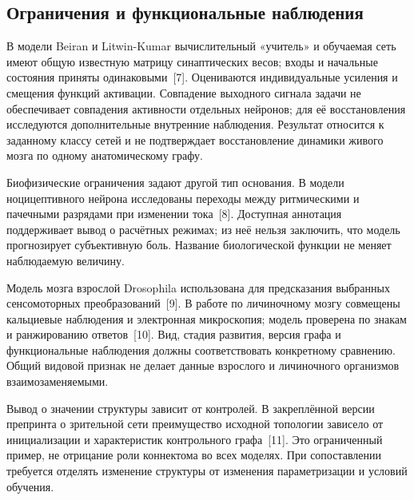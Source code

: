 \documentclass[12pt,a4paper]{article}
\begin{document}
\subsection*{Ограничения и функциональные наблюдения}
В модели Beiran и Litwin-Kumar вычислительный «учитель» и обучаемая сеть имеют общую известную матрицу синаптических весов; входы и начальные состояния приняты одинаковыми~\mbox{[7]}. Оцениваются индивидуальные усиления и смещения функций активации. Совпадение выходного сигнала задачи не обеспечивает совпадения активности отдельных нейронов; для её восстановления исследуются дополнительные внутренние наблюдения. Результат относится к заданному классу сетей и не подтверждает восстановление динамики живого мозга по одному анатомическому графу.\par
Биофизические ограничения задают другой тип основания. В модели ноцицептивного нейрона исследованы переходы между ритмическими и пачечными разрядами при изменении тока~\mbox{[8]}. Доступная аннотация поддерживает вывод о расчётных режимах; из неё нельзя заключить, что модель прогнозирует субъективную боль. Название биологической функции не меняет наблюдаемую величину.\par
Модель мозга взрослой Drosophila использована для предсказания выбранных сенсомоторных преобразований~\mbox{[9]}. В работе по личиночному мозгу совмещены кальциевые наблюдения и электронная микроскопия; модель проверена по знакам и ранжированию ответов~\mbox{[10]}. Вид, стадия развития, версия графа и функциональные наблюдения должны соответствовать конкретному сравнению. Общий видовой признак не делает данные взрослого и личиночного организмов взаимозаменяемыми.\par
Вывод о значении структуры зависит от контролей. В закреплённой версии препринта о зрительной сети преимущество исходной топологии зависело от инициализации и характеристик контрольного графа~\mbox{[11]}. Это ограниченный пример, не отрицание роли коннектома во всех моделях. При сопоставлении требуется отделять изменение структуры от изменения параметризации и условий обучения.\par
\end{document}
